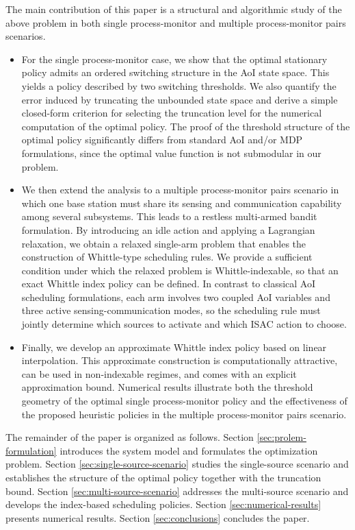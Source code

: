 \documentclass[letterpaper,journal]{IEEEtran}
\begin{document}
The main contribution of this paper is a structural and algorithmic study of the above problem in both single process-monitor and multiple process-monitor pairs scenarios.
\begin{itemize}
    \item For the single process-monitor case, we show that the optimal stationary policy admits an ordered switching structure in the AoI state space. This yields a policy described by two switching thresholds. We also quantify the error induced by truncating the unbounded state space and derive a simple closed-form criterion for selecting the truncation level for the numerical computation of the optimal policy. The proof of the threshold structure of the optimal policy significantly differs from standard AoI and/or MDP formulations, since the optimal value function is not submodular in our problem.
    \item We then extend the analysis to a multiple process-monitor pairs scenario in which one base station must share its sensing and communication capability among several subsystems. This leads to a restless multi-armed bandit formulation. By introducing an idle action and applying a Lagrangian relaxation, we obtain a relaxed single-arm problem that enables the construction of Whittle-type scheduling rules. We provide a sufficient condition under which the relaxed problem is Whittle-indexable, so that an exact Whittle index policy can be defined. In contrast to classical AoI scheduling formulations, each arm involves two coupled AoI variables and three active sensing-communication modes, so the scheduling rule must jointly determine which sources to activate and which ISAC action to choose.
    \item Finally, we develop an approximate Whittle index policy based on linear interpolation. This approximate construction is computationally attractive, can be used in non-indexable regimes, and comes with an explicit approximation bound. Numerical results illustrate both the threshold geometry of the optimal single process-monitor policy and the effectiveness of the proposed heuristic policies in the multiple process-monitor pairs scenario.
\end{itemize}

The remainder of the paper is organized as follows. Section \ref{sec:prolem-formulation} introduces the system model and formulates the optimization problem. Section \ref{sec:single-source-scenario} studies the single-source scenario and establishes the structure of the optimal policy together with the truncation bound. Section \ref{sec:multi-source-scenario} addresses the multi-source scenario and develops the index-based scheduling policies. Section \ref{sec:numerical-results} presents numerical results. Section \ref{sec:conclusions} concludes the paper.
\end{document}
